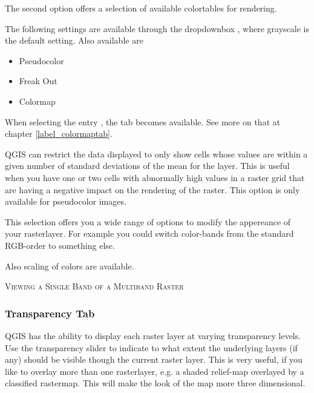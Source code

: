 The second option offers a selection of available colortables for rendering.

The following settings are available through the dropdownbox
, where grayscale is the default
setting.
Also available are
\begin{itemize}
\item Pseudocolor
\item Freak Out
\item Colormap
\end{itemize}

When selecting the entry , the tab
 becomes available. See more on that at chapter
\ref{label_colormaptab}.

QGIS can restrict the data displayed to only show cells whose values are
within a given number of standard deviations of the mean for the
layer. This is useful when you have one or
two cells with abnormally high values in a raster grid that are having a
negative impact on the rendering of the raster. This option is only available
for pseudocolor images.


This selection offers you a wide range of options to modify the appereance
of your rasterlayer. For example you could switch color-bands from the
standard RGB-order to something else.

Also scaling of colors are available.


\begin{Tip}\caption{\textsc{Viewing a Single Band of a Multiband Raster}}
\end{Tip} 

\subsubsection{Transparency Tab} \label{rastertab:transparency}

QGIS has the ability to display each raster layer at varying transparency
levels. Use the transparency slider to indicate to
what extent the underlying layers (if any) should be visible though the
current raster layer. 
This is very useful, if
you like to overlay more than one rasterlayer, e.g. a shaded relief-map
overlayed by a classified rastermap. This will make the look of the map
more three dimensional.

